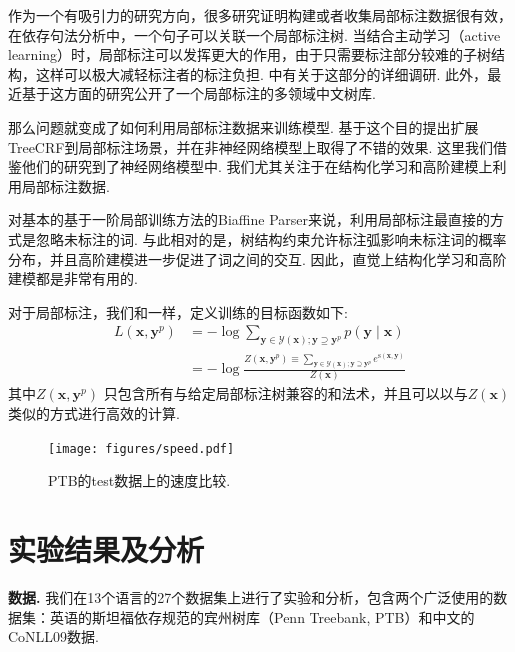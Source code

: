 作为一个有吸引力的研究方向，很多研究证明构建或者收集局部标注数据很有效\cite{nivre-etal-2014-squibs,hwa-99-partial-annotation,pereira-92-inside-outside}，在依存句法分析中，一个句子可以关联一个局部标注树.
当结合主动学习（active learning）时，局部标注可以发挥更大的作用，由于只需要标注部分较难的子树结构，这样可以极大减轻标注者的标注负担.
\cite{li-etal-2016-active}中有关于这部分的详细调研.
此外，\cite{peng2019overview}最近基于这方面的研究公开了一个局部标注的多领域中文树库.

那么问题就变成了如何利用局部标注数据来训练模型.
\cite{li-etal-2016-active}基于这个目的提出扩展TreeCRF到局部标注场景，并在非神经网络模型上取得了不错的效果.
这里我们借鉴他们的研究到了神经网络模型中.
我们尤其关注于在结构化学习和高阶建模上利用局部标注数据.

对基本的基于一阶局部训练方法的Biaffine Parser来说，利用局部标注最直接的方式是忽略未标注的词.
与此相对的是，树结构约束允许标注弧影响未标注词的概率分布，并且高阶建模进一步促进了词之间的交互.
因此，直觉上结构化学习和高阶建模都是非常有用的.

对于局部标注，我们和\cite{li-etal-2016-active}一样，定义训练的目标函数如下:
\begin{equation}
    \label{eq:training-loss-treecrf-partial}
    \begin{split}
        \mathit{L}(\boldsymbol{x}, {\boldsymbol{y}^p}) &= -\log \sum\limits_{\boldsymbol{y} \in \mathcal{Y}(\boldsymbol{x}); \boldsymbol{y} \supseteq {\boldsymbol{y}^p}} p(\boldsymbol{y}\mid\boldsymbol{x})  \\
        &= - \log \frac{Z(\boldsymbol{x}, {\boldsymbol{y}^p}) \equiv \sum\limits_{\boldsymbol{y} \in \mathcal{Y}(\boldsymbol{x}); \boldsymbol{y} \supseteq \boldsymbol{y}^p} e^{\mathrm{s}(\boldsymbol{x},\boldsymbol{y})}}{Z(\boldsymbol{x})}
    \end{split}
\end{equation}
其中$Z(\boldsymbol{x}, {\boldsymbol{y}^p})$ 只包含所有与给定局部标注树兼容的和法术，并且可以以与$Z(\boldsymbol{x})$类似的方式进行高效的计算.

\begin{figure}[tb]
    \centering
    \texttt{[image: figures/speed.pdf]}
    \caption{
        PTB的test数据上的速度比较.
    }
    \label{fig:speed}
\end{figure}

\section{实验结果及分析}\label{sec:dep-exps}
\noindent\textbf{数据.}
我们在13个语言的27个数据集上进行了实验和分析，包含两个广泛使用的数据集：英语的斯坦福依存规范\cite{chen-manning-2014-fast}的宾州树库（Penn Treebank, PTB）和中文的CoNLL09数据\cite{hajic-etal-2009-conll}.


